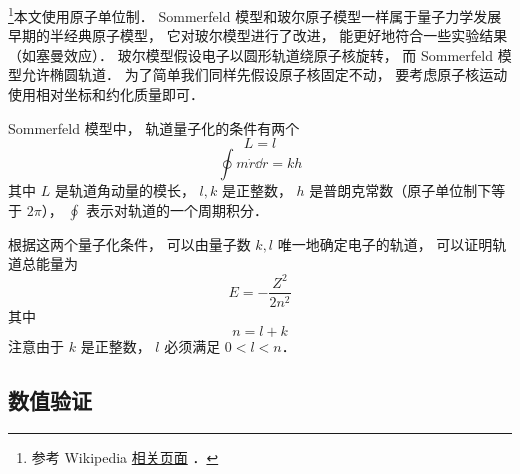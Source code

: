 

\footnote{参考 Wikipedia \href{https://en.wikipedia.org/wiki/Old_quantum_theory}{相关页面}
．}本文使用原子单位制． Sommerfeld 模型和玻尔原子模型一样属于量子力学发展早期的半经典原子模型， 它对玻尔模型进行了改进， 能更好地符合一些实验结果（如塞曼效应）． 玻尔模型假设电子以圆形轨道绕原子核旋转， 而 Sommerfeld 模型允许椭圆轨道． 为了简单我们同样先假设原子核固定不动， 要考虑原子核运动使用相对坐标和约化质量即可．

Sommerfeld 模型中， 轨道量子化的条件有两个
\begin{equation}\label{BohrEc_eq4}
L = l
\end{equation}
\begin{equation}\label{BohrEc_eq3}
\oint m\dot r \dd{r} = kh
\end{equation}
其中 $L$ 是轨道角动量的模长， $l, k$ 是正整数， $h$ 是普朗克常数（原子单位制下等于 $2\pi$）， $\oint$ 表示对轨道的一个周期积分． 

根据这两个量子化条件， 可以由量子数 $k, l$ 唯一地确定电子的轨道， 可以证明轨道总能量为
\begin{equation}\label{BohrEc_eq5}
E = -\frac{Z^2}{2n^2}
\end{equation}
其中
\begin{equation}\label{BohrEc_eq2}
n = l + k
\end{equation}
注意由于 $k$ 是正整数， $l$ 必须满足 $0 < l < n$．

\subsection{数值验证}


